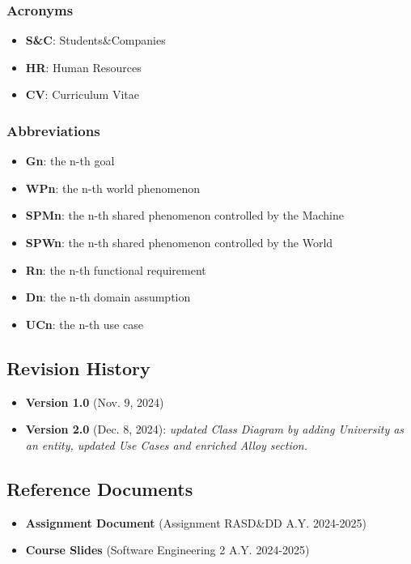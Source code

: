 \documentclass{article}
\begin{document}
\subsubsection{Acronyms}

\begin{itemize}
    \item \textbf{S\&C}: Students\&Companies
    \item \textbf{HR}: Human Resources
    \item \textbf{CV}: Curriculum Vitae
\end{itemize}


\subsubsection{Abbreviations}

\begin{itemize}
    \item \textbf{Gn}: the n-th goal
    \item \textbf{WPn}: the n-th world phenomenon
    \item \textbf{SPMn}: the n-th shared phenomenon controlled by the Machine
    \item \textbf{SPWn}: the n-th shared phenomenon controlled by the World
    \item \textbf{Rn}: the n-th functional requirement
    \item \textbf{Dn}: the n-th domain assumption
    \item \textbf{UCn}: the n-th use case
\end{itemize}


\subsection{Revision History}

\begin{itemize}
    \item \textbf{Version 1.0} (Nov. 9, 2024)
    \item \textbf{Version 2.0} (Dec. 8, 2024): \textit{updated Class Diagram by adding University as an entity, updated Use Cases and enriched Alloy section.}
\end{itemize}

\subsection{Reference Documents}

\begin{itemize}
    \item \textbf{Assignment Document} (Assignment RASD\&DD A.Y. 2024-2025)
    \item \textbf{Course Slides} (Software Engineering 2 A.Y. 2024-2025)
\end{itemize}
\end{document}
